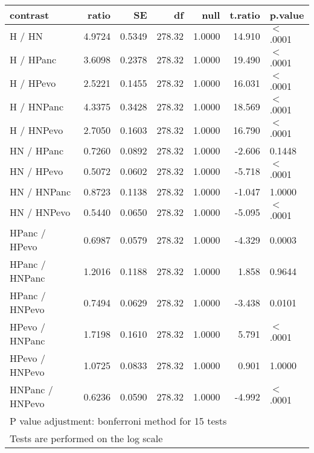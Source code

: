 \begin{table}[ht]
\centering
\begin{tabular}{lrrrrrl}
  \hline
contrast & ratio & SE & df & null & t.ratio & p.value \\ 
  \hline
H / HN & 4.9724 & 0.5349 & 278.32 & 1.0000 & 14.910 & $<$.0001 \\ 
  H / HPanc & 3.6098 & 0.2378 & 278.32 & 1.0000 & 19.490 & $<$.0001 \\ 
  H / HPevo & 2.5221 & 0.1455 & 278.32 & 1.0000 & 16.031 & $<$.0001 \\ 
  H / HNPanc & 4.3375 & 0.3428 & 278.32 & 1.0000 & 18.569 & $<$.0001 \\ 
  H / HNPevo & 2.7050 & 0.1603 & 278.32 & 1.0000 & 16.790 & $<$.0001 \\ 
  HN / HPanc & 0.7260 & 0.0892 & 278.32 & 1.0000 & -2.606 & 0.1448 \\ 
  HN / HPevo & 0.5072 & 0.0602 & 278.32 & 1.0000 & -5.718 & $<$.0001 \\ 
  HN / HNPanc & 0.8723 & 0.1138 & 278.32 & 1.0000 & -1.047 & 1.0000 \\ 
  HN / HNPevo & 0.5440 & 0.0650 & 278.32 & 1.0000 & -5.095 & $<$.0001 \\ 
  HPanc / HPevo & 0.6987 & 0.0579 & 278.32 & 1.0000 & -4.329 & 0.0003 \\ 
  HPanc / HNPanc & 1.2016 & 0.1188 & 278.32 & 1.0000 & 1.858 & 0.9644 \\ 
  HPanc / HNPevo & 0.7494 & 0.0629 & 278.32 & 1.0000 & -3.438 & 0.0101 \\ 
  HPevo / HNPanc & 1.7198 & 0.1610 & 278.32 & 1.0000 & 5.791 & $<$.0001 \\ 
  HPevo / HNPevo & 1.0725 & 0.0833 & 278.32 & 1.0000 & 0.901 & 1.0000 \\ 
  HNPanc / HNPevo & 0.6236 & 0.0590 & 278.32 & 1.0000 & -4.992 & $<$.0001 \\ 
   \hline
\multicolumn{7}{l}{{\footnotesize P value adjustment: bonferroni method for 15 tests}}\\

\multicolumn{7}{l}{{\footnotesize Tests are performed on the log scale}}\\
\end{tabular}
\end{table}

